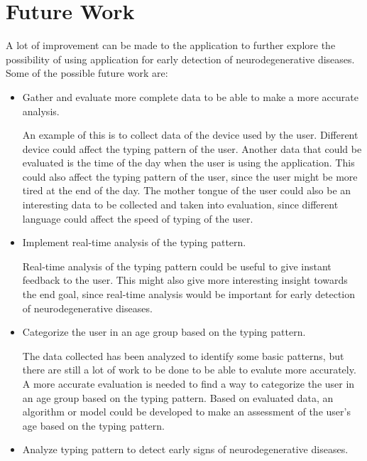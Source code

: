 \section{Future Work}


A lot of improvement can be made to the application to further explore the possibility of using application for early detection of neurodegenerative diseases.
Some of the possible future work are:
\begin{itemize}
    \item Gather and evaluate more complete data to be able to make a more accurate analysis.
    
    An example of this is to collect data of the device used by the user.
    Different device could affect the typing pattern of the user.
    Another data that could be evaluated is the time of the day when the user is using the application.
    This could also affect the typing pattern of the user, since the user might be more tired at the end of the day.
    The mother tongue of the user could also be an interesting data to be collected and taken into evaluation, since different language could affect the speed of typing of the user.

    \item Implement real-time analysis of the typing pattern.
    
    Real-time analysis of the typing pattern could be useful to give instant feedback to the user.
    This might also give more interesting insight towards the end goal, since real-time analysis would be important for early detection of neurodegenerative diseases.

    \item Categorize the user in an age group based on the typing pattern.
    
    The data collected has been analyzed to identify some basic patterns, but there are still a lot of work to be done to be able to evalute more accurately.
    A more accurate evaluation is needed to find a way to categorize the user in an age group based on the typing pattern.
    Based on evaluated data, an algorithm or model could be developed to make an assessment of the user's age based on the typing pattern. 

    \item Analyze typing pattern to detect early signs of neurodegenerative diseases.

\end{itemize}

